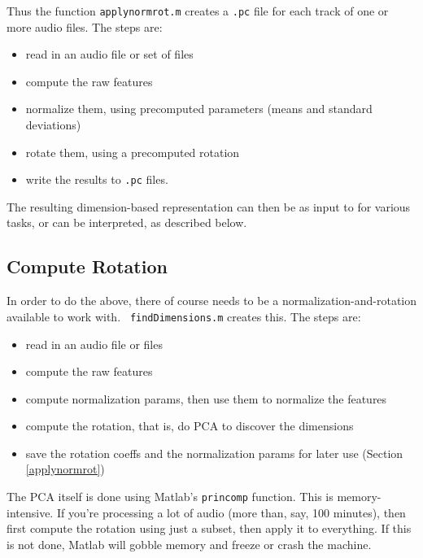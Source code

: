 \documentclass[11pt]{article}
\begin{document}
Thus the function {\tt applynormrot.m} creates a {\tt .pc} file for
each track of one or more audio files.  The steps are:
\begin{itemize}   \setlength{\itemsep}{0pt}\setlength{\parskip}{0pt}
\item read in an audio file or set of files
\item compute the raw  features
\item normalize them, using  precomputed parameters (means and
  standard deviations)
\item  rotate them, using a precomputed rotation
\item  write the results to {\tt .pc} files.
\end{itemize}

The resulting dimension-based representation can then be as input to
for various tasks, or can be interpreted, as described below.


\subsection{Compute Rotation} \label{computerotation}

In order to do the above, there of course needs to be a
normalization-and-rotation available to work with.  {\tt
  findDimensions.m} creates this.  The steps are:
\begin{itemize}   \setlength{\itemsep}{0pt}\setlength{\parskip}{0pt}
\item read in an audio file or files
\item compute the raw  features
\item compute normalization params, then use them to normalize the features
\item compute the rotation, that is, do PCA to discover the dimensions
\item save the rotation coeffs and the normalization params for later use (Section \ref{applynormrot})
\end{itemize}

The PCA itself is done using Matlab's {\tt princomp} function.  This
is memory-intensive.  If you're processing a lot of audio (more than,
say, 100 minutes), then first compute the rotation using just a
subset, then apply it to everything.  If this is not done, Matlab
will gobble memory and freeze or crash the machine.
\end{document}
